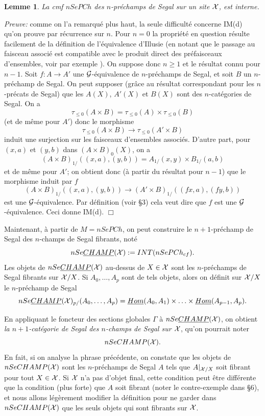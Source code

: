 \documentclass[12pt]{article}
\newcommand{\eop}{\hfill $\Box$\vspace{.1in}}
\newtheorem{lemme}[lemma]{Lemme}
\newcommand{\Gg}{{\cal G}}
\newcommand{\Xx}{{\cal X}}
\begin{document}
\begin{lemme}
La cmf $nSePCh$ des $n$-pr\'echamps de Segal sur un site $\Xx$, est interne.
\end{lemme}
{\em Preuve:} comme on l'a remarqu\'e plus haut, la seule
difficult\'e concerne IM(d)
qu'on prouve par r\'ecurrence sur $n$. Pour $n=0$ la propri\'et\'e en question
r\'esulte facilement de la d\'efinition de l'\'equivalence d'Illusie (en notant
que le passage au faisceau associ\'e est
compatible avec le produit direct
des pr\'efaisceaux d'ensembles, voir par exemple \cite{Rezk}). On suppose donc
$n\geq 1$ et le r\'esultat connu pour $n-1$.  Soit $f:A\rightarrow A'$ une
$\Gg$-\'equivalence de $n$-pr\'echamps de Segal, et soit $B$ un
$n$-pr\'echamp de
Segal.  On peut supposer (gr\^ace au r\'esultat correspondant pour les
$n$-pr\'ecats
de Segal) que les $A(X)$, $A'(X)$ et $B(X)$ sont des $n$-cat\'egories de Segal.
On a
$$
\tau _{\leq 0} (A\times B)= \tau _{\leq 0}(A)\times \tau _{\leq 0} (B)
$$
(et de m\^eme pour $A'$)
donc le morphisme
$$
\tau _{\leq 0} (A\times B)\rightarrow \tau _{\leq 0} (A'\times B)
$$
induit une surjection sur les faisceaux d'ensembles associ\'es. D'autre part,
pour $(x,a)$ et $(y,b)$ dans $(A\times B)_0(X)$, on a
$$
(A\times B)_{1/}((x,a), (y,b))= A_{1/}(x,y)\times B_{1/}(a,b)
$$
et de m\^eme pour $A'$; on obtient donc (\`a partir du r\'esultat pour
$n-1$) que le morphisme induit par $f$
$$
(A\times B)_{1/}((x,a), (y,b))\rightarrow
(A'\times B)_{1/}((fx,a), (fy,b))
$$
est une $\Gg$-\'equivalence. Par d\'efinition (voir \S 3) cela veut dire que
$f$ est une $\Gg$-\'equivalence. Ceci donne IM(d).
\eop



Maintenant,
\`a partir de $M=nSePCh$, on peut construire le $n+1$-pr\'echamp de Segal
des $n$-champs de Segal fibrants, not\'e
$$
nSe\underline{CHAMP}(\Xx ):= INT(nSePCh_{cf}).
$$
Les objets de $nSe\underline{CHAMP}(\Xx )$ au-dessus de $X\in \Xx$ sont les
$n$-pr\'echamps de Segal fibrants sur $\Xx /X$. Si $A_0,\ldots , A_p$ sont de
tels objets, alors on d\'efinit sur $\Xx /X$ le $n$-pr\'echamp de Segal
$$
nSe\underline{CHAMP}(\Xx )_{p/}(A_0,\ldots , A_p)=
\underline{Hom}(A_0,A_1)\times \ldots \times \underline{Hom}(A_{p-1}, A_p).
$$

En appliquant le foncteur des sections globales $\Gamma$ \`a
$nSe\underline{CHAMP}(\Xx )$, on obtient {\em la
$n+1$-cat\'egorie de Segal des $n$-champs de Segal sur $\Xx$},
qu'on pourrait noter
$$
nSeCHAMP(\Xx ).
$$
En fait, si on analyse la phrase pr\'ec\'edente, on constate que
les objets de $nSeCHAMP(\Xx )$
sont les $n$-pr\'echamps de Segal $A$ tels que $A|_{\Xx /X}$ soit
fibrant pour tout $X\in \Xx$. Si $\Xx$ n'a pas d'objet final, cette condition
peut \^etre diff\'erente que la condition (plus forte) que $A$ soit fibrant
(noter le contre-exemple dans \S 6),
et nous allons l\'eg\`erement modifier la d\'efinition pour ne garder dans
$nSeCHAMP(\Xx )$ que les seuls objets qui sont fibrants sur $\Xx$.
\end{document}
